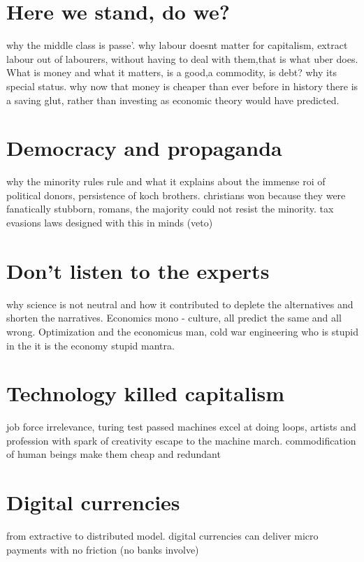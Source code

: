 \documentclass[11pt, onecolumn]{article}
\begin{document}
\section{Here we stand, do we?}
\label{se:hisacc}
why the middle class is passe'.
why labour doesnt matter for capitalism, extract labour out of labourers, without having to deal with them,that is what uber does.
What is money and what it matters, is a good,a commodity, is debt? why its special status.
why now that money is cheaper than ever before in history there is a saving glut, rather than investing as economic theory would have predicted.

\section{Democracy and propaganda}
\label{se:hisacc}
why the minority rules rule and what it explains about the immense roi of political donors, persistence of koch brothers. christians won because they were fanatically stubborn, romans, the majority could not resist the minority. 
tax evasions laws designed with this in minds (veto)


\section{Don't listen to the experts}
\label{se:hisacc}
why science is not neutral and how it contributed to deplete the alternatives and shorten the narratives.
Economics mono - culture, all predict the same and all wrong.
Optimization and the economicus man, cold war engineering
who is stupid in the it is the economy stupid mantra.

\section{Technology killed capitalism}
\label{se:hisacc}
job force irrelevance, turing test passed
machines excel at doing loops, artists and profession with spark of creativity escape to the machine march.
commodification of human beings make them cheap and redundant

\section{Digital currencies}
\label{se:hisacc}
from extractive to distributed model.
digital currencies can deliver micro payments with no friction (no banks involve)
\end{document}
